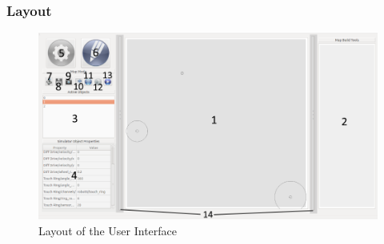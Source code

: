  \subsubsection*{Layout}
  \begin{figure}[h!]
 	\begin{center}
 	\includegraphics[width=\textwidth]{./images_design/UI_Overview}
 	\caption{Layout of the User Interface\label{fig:ui_overview}}
 	\end{center}
 \end{figure}
 
